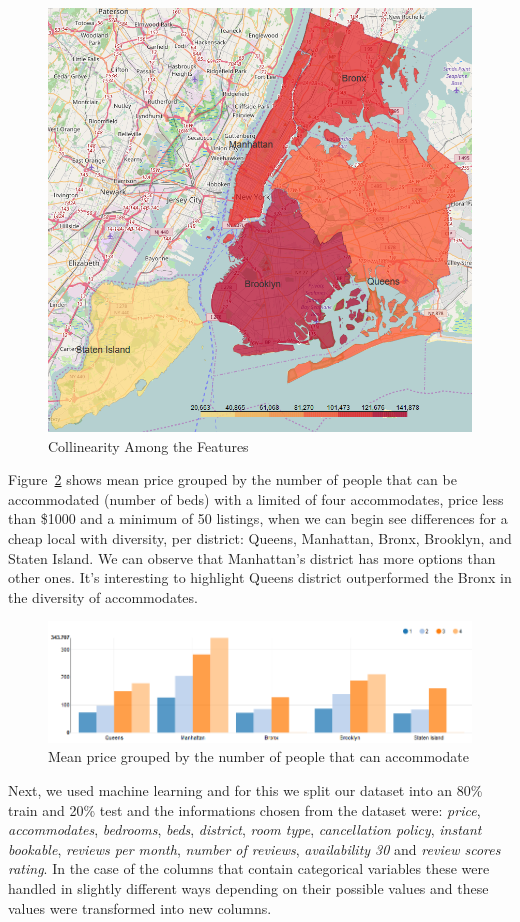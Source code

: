 \documentclass[sigconf]{acmart}
\begin{document}
\begin{figure}[!htpb]
	\centering
	\includegraphics[width=0.7\linewidth]{images/incidents_per_district}
	\caption{Collinearity Among the Features}
	\label{fig:datadistribution:incidents}
\end{figure}

Figure~\ref{fig:meanpriceperaccomodate} shows mean price grouped by the number of people that can be accommodated (number of beds) with a limited of four accommodates, price less than \$1000 and a minimum of 50 listings, when we can begin see differences for a cheap local with diversity, per district: Queens, Manhattan, Bronx, Brooklyn, and Staten Island. We can observe that Manhattan's district has more options than other ones. It's interesting to highlight Queens district outperformed the Bronx in the diversity of accommodates. 

\begin{figure}[!htpb]
	\centering
	\includegraphics[width=\linewidth]{images/mean_price_per_accomodate}
	\caption{Mean price grouped by the number of people that can accommodate}
	\label{fig:meanpriceperaccomodate}
\end{figure}

Next, we used machine learning and for this we split our dataset into an 80\% train and 20\% test and the informations chosen from the dataset were:  \textit{price}, \textit{accommodates}, \textit{bedrooms}, \textit{beds}, \textit{district}, \textit{room type}, \textit{cancellation policy}, \textit{instant bookable}, \textit{reviews per month}, \textit{number of reviews}, \textit{availability 30} and \textit{review scores rating}. In the case of the columns that contain categorical variables these were handled in slightly different ways depending on their possible values and these values were transformed into new columns. 
\end{document}
